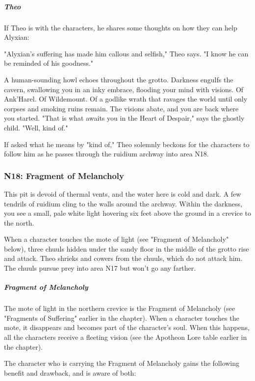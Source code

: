 \documentclass[10pt,a4paper,twoside,bg=print,twocolumn,openany,nodeprecatedcode]{dndbook}
\begin{document}
\subparagraph{Theo}
If Theo is with the characters, he shares some thoughts on how they can help Alyxian:

\begin{DndReadAloud}{}
"Alyxian's suffering has made him callous and selfish," Theo says. "I know he can be reminded of his goodness."

A human-sounding howl echoes throughout the grotto. Darkness engulfs the cavern, swallowing you in an inky embrace, flooding your mind with visions. Of Ank'Harel. Of Wildemount. Of a godlike wrath that ravages the world until only corpses and smoking ruins remain. The visions abate, and you are back where you started. "That is what awaits you in the Heart of Despair," says the ghostly child. "Well, kind of."

\end{DndReadAloud}

If asked what he means by "kind of," Theo solemnly beckons for the characters to follow him as he passes through the ruidium archway into area N18.

\subsubsection{N18: Fragment of Melancholy}
\begin{DndReadAloud}{}
This pit is devoid of thermal vents, and the water here is cold and dark. A few tendrils of ruidium cling to the walls around the archway. Within the darkness, you see a small, pale white light hovering six feet above the ground in a crevice to the north.

\end{DndReadAloud}

When a character touches the mote of light (see "Fragment of Melancholy" below), three chuuls hidden under the sandy floor in the middle of the grotto rise and attack. Theo shrieks and cowers from the chuuls, which do not attack him. The chuuls pursue prey into area N17 but won't go any farther.

\subparagraph{Fragment of Melancholy}
The mote of light in the northern crevice is the Fragment of Melancholy (see "Fragments of Suffering" earlier in the chapter). When a character touches the mote, it disappears and becomes part of the character's soul. When this happens, all the characters receive a fleeting vision (see the Apotheon Lore table earlier in the chapter).

The character who is carrying the Fragment of Melancholy gains the following benefit and drawback, and is aware of both:
\end{document}
